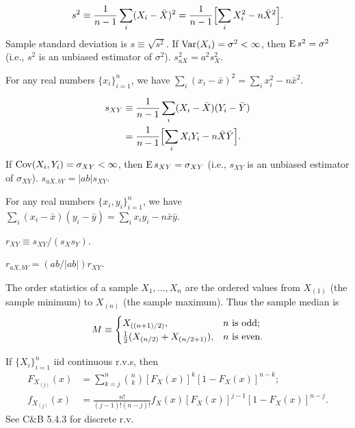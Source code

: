 \documentclass[8pt,letterpaper, landscape]{extarticle} %
\begin{document}
\begin{multicols}{3}
\begin{description}
$$ s^2 \equiv \frac{1}{n-1} \sum_i (X_i - \bar{X})^2 = \frac{1}{n-1}  \Bigl [ \sum_{i} X_i^2 - n \bar{X}^2 \Bigr ] .$$
Sample standard deviation is $ s \equiv \sqrt{s^2} $. If $ \operatorname{Var} (X_i) = \sigma^2 < \infty $, then $ \operatorname{E} s^2 = \sigma^2 $ (i.e., $ s^2 $ is an unbiased estimator of $ \sigma^2 $). $ s_{aX}^{2} = a^2 s_X^2 $.

For any real numbers $ \{ x_i \}_{i=1}^{n} $, we have $ \sum_i (x_i - \bar{x})^2 = \sum_i x_i^2 - n\bar{x}^2 $.

\begin{align*}
s_{XY} &\equiv \frac{1}{n-1} \sum_i (X_i - \bar{X})(Y_i - \bar{Y}) \\
&= \frac{1}{n-1}  \Bigl [ \sum_{i} X_i Y_i - n \bar{X} \bar{Y} \Bigr ] .
\end{align*}
If $ \operatorname{Cov} (X_i, Y_i) = \sigma_{XY} < \infty $, then $ \operatorname{E} s_{XY} = \sigma_{XY} $ (i.e., $ s_{XY} $ is an unbiased estimator of $ \sigma_{XY} $). $ s_{aX, bY} = |ab| s_{XY} $.

For any real numbers $ \{ x_i, y_i \}_{i=1}^{n} $, we have $ \sum_i (x_i - \bar{x})(y_i - \bar{y}) = \sum_i x_i y_i - n\bar{x}\bar{y} $.

 $ r_{XY} \equiv s_{XY} / (s_{X} s_{Y}) $.

$ r_{aX, bY} = (ab / |ab|) r_{XY} $.

 The order statistics of a sample $ X_1 , \dotsc , X_n $ are the ordered values from $ X_{(1)} $ (the sample minimum) to $ X_{(n)} $ (the sample maximum). Thus the sample median is
\[ M \equiv \begin{cases} X_{((n+1)/2)}, & \text{$ n $ is odd;} \\ \tfrac{1}{2} (X_{(n/2)} + X_{(n/2 + 1)}), & \text{$ n $ is even.} \end{cases} \]

If $ \{ X_i \}_{i=1}^{n} $ iid continuous r.v.s, then
\begin{align*}
F_{X_{(j)}} (x) &= \sum_{k=j}^{n} \binom{n}{k} [F_X (x)]^{k} [1 - F_X (x)]^{n-k}; \\
f_{X_{(j)}} (x) &= \frac{n!}{(j-1)! (n-j)!} f_X (x) [F_X (x)]^{j-1} [1 - F_X (x)]^{n-j}.
\end{align*}
See C\&B 5.4.3 for discrete r.v.


\end{description}
\end{multicols}
\end{document}
